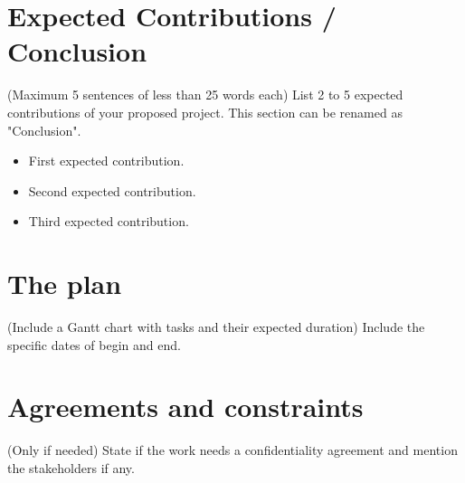 \documentclass[11pt,a4paper]{article}
\begin{document}
\section{Expected Contributions / Conclusion}
({\color{blue}Maximum 5 sentences of less than 25 words each}) List 2 to 5 expected contributions of your proposed project. This section can be renamed as "Conclusion".
\begin{itemize}
\item First expected contribution.
\item Second expected contribution.
\item Third expected contribution.
\end{itemize}

\appendix
\section{The plan}
({\color{blue}Include a Gantt chart with tasks and their expected duration}) Include the specific dates of begin and end.

 
\section{Agreements and constraints}
({\color{blue}Only if needed}) State if the work needs a confidentiality agreement and mention the stakeholders if any.




\end{document}
